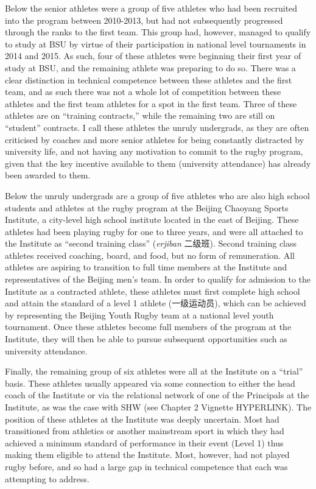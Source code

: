 \begin{CJK}{UTF8}{gbsn}


  Below the senior athletes were a group of five athletes who had been recruited into the program between 2010-2013, but had not subsequently progressed through the ranks to the first team. This group had, however, managed to qualify to study at BSU by virtue of their participation in national level tournaments in 2014 and 2015. As such, four of these athletes were beginning their first year of study at BSU, and the remaining athlete was preparing to do so. There was a clear distinction in technical competence between these athletes and the first team, and as such there was not a whole lot of competition between these athletes and the first team athletes for a spot in the first team.  Three of these athletes are on ``training contracts,'' while the remaining two are still on ``student'' contracts.  I call these athletes the unruly undergrads, as they are often criticised by coaches and more senior athletes for being constantly distracted by university life, and not having any motivation to commit to the rugby program, given that the key incentive available to them (university attendance) has already been awarded to them.



  Below the unruly undergrads are a group of five athletes who are also high school students and athletes at the rugby program at the Beijing Chaoyang Sports Institute, a city-level high school institute located in the east of Beijing.  These athletes had been playing rugby for one to three years, and were all attached to the Institute as ``second training class'' (\textit{erjiban} 二级班).  Second training class athletes received coaching, board, and food, but no form of remuneration.  All athletes are aspiring to transition to full time members at the Institute and representatives of the Beijing men's team.  In order to qualify for admission to the Institute as a contracted athlete, these athletes must first complete high school and attain the standard of a level 1 athlete (一级运动员), which can be achieved by representing the Beijing Youth Rugby team at a national level youth tournament.  Once these athletes become full members of the program at the Institute, they will then be able to pursue subsequent opportunities such as university attendance.

  Finally, the remaining group of six athletes were all at the Institute on a ``trial'' basis.  These athletes usually appeared via some connection to either the head coach of the Institute or via the relational network of one of the Principals at the Institute, as was the case with SHW (see Chapter 2 Vignette HYPERLINK). The position of these athletes at the Institute was deeply uncertain.  Most had transitioned from athletics or another mainstream sport in which they had achieved a minimum standard of performance in their event (Level 1) thus making them eligible to attend the Institute.  Most, however, had not played rugby before, and so had a large gap in technical competence that each was attempting to address.



\end{CJK}
